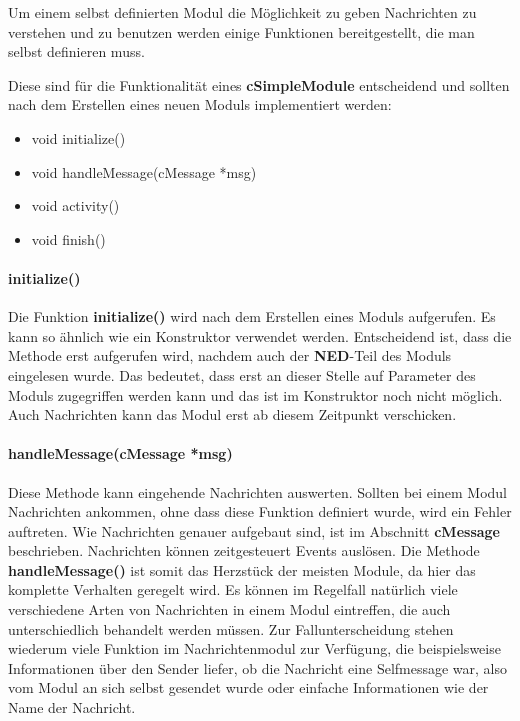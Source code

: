 Um einem selbst definierten Modul die Möglichkeit zu geben Nachrichten zu verstehen und zu benutzen werden einige Funktionen bereitgestellt, die man selbst definieren muss.

Diese sind für die Funktionalität eines \textbf{cSimpleModule} entscheidend und sollten nach dem Erstellen eines neuen Moduls implementiert werden:

\begin{itemize}
\item void initialize()
\item void handleMessage(cMessage *msg)
\item void activity()
\item void finish()
\end{itemize}

\paragraph{initialize()}

Die Funktion \textbf{initialize()} wird nach dem Erstellen eines Moduls aufgerufen. Es kann so ähnlich wie ein Konstruktor verwendet werden. Entscheidend ist, dass die Methode erst aufgerufen wird, nachdem auch der \textbf{NED}-Teil des Moduls eingelesen wurde. Das bedeutet, dass erst an dieser Stelle auf Parameter des Moduls zugegriffen werden kann und das ist im Konstruktor noch nicht möglich. Auch Nachrichten kann das Modul erst ab diesem Zeitpunkt verschicken.

\paragraph{handleMessage(cMessage *msg)}

Diese Methode kann eingehende Nachrichten auswerten. Sollten bei einem Modul Nachrichten ankommen, ohne dass diese Funktion definiert wurde, wird ein Fehler auftreten. Wie Nachrichten genauer aufgebaut sind, ist im Abschnitt \textbf{cMessage} beschrieben.
Nachrichten können zeitgesteuert Events auslösen. Die Methode \textbf{handleMessage()} ist somit das Herzstück der meisten Module, da hier das komplette Verhalten geregelt wird. \newline
Es können im Regelfall natürlich viele verschiedene Arten von Nachrichten in einem Modul eintreffen, die auch unterschiedlich behandelt werden müssen. Zur Fallunterscheidung stehen wiederum viele Funktion im Nachrichtenmodul zur Verfügung, die beispielsweise Informationen über den Sender liefer, ob die Nachricht eine Selfmessage war, also vom Modul an sich selbst gesendet wurde oder einfache Informationen wie der Name der Nachricht.

